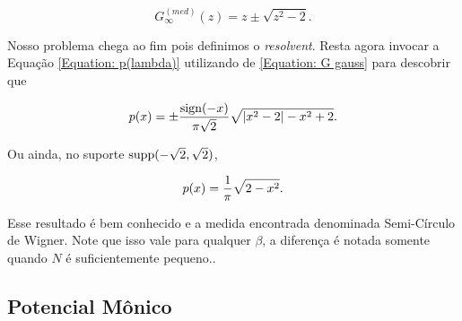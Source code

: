 



\begin{equation}
	G_{\infty}^{(med)}(z) = z \pm \sqrt{z^2 - 2}
	\label{Equation: G gauss}.
\end{equation}

Nosso problema chega ao fim pois definimos o \textit{resolvent}. Resta agora invocar a Equação \ref{Equation: p(lambda)} utilizando de \ref{Equation: G gauss} para descobrir que

\begin{equation*}
	p(x) = \pm \frac{\operatorname{sign}(-x)}{\pi \sqrt{2}} \sqrt{|x^2 - 2| - x^2 + 2}.
\end{equation*}

\noindent Ou ainda, no suporte $\operatorname{supp}(-\sqrt{2}, \sqrt{2})$,

\begin{equation}
	p(x) = \frac{1}{\pi} \sqrt{2 - x^2}.
\end{equation}

Esse resultado é bem conhecido e a medida encontrada denominada Semi-Círculo de Wigner. Note que isso vale para qualquer $\beta$, a diferença é notada somente quando $N$ é suficientemente pequeno..


\subsection{Potencial Mônico}

